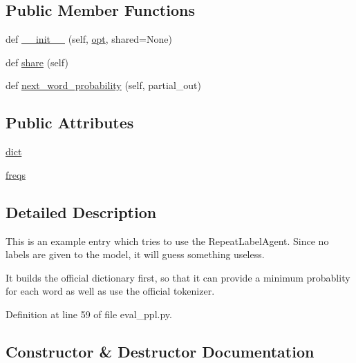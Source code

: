 \subsection*{Public Member Functions}
\begin{DoxyCompactItemize}
\item 
def \hyperlink{classprojects_1_1convai2_1_1eval__ppl_1_1WordFrequencyEntry_a3dfd58c2bf262228339cf3728b6b0caa}{\+\_\+\+\_\+init\+\_\+\+\_\+} (self, \hyperlink{classparlai_1_1core_1_1agents_1_1Agent_ab3b45d2754244608c75d4068b90cd051}{opt}, shared=None)
\item 
def \hyperlink{classprojects_1_1convai2_1_1eval__ppl_1_1WordFrequencyEntry_a5abf8443347e45742e911d441a8b9c10}{share} (self)
\item 
def \hyperlink{classprojects_1_1convai2_1_1eval__ppl_1_1WordFrequencyEntry_abc7d4ea01f82e42e8a18794e620de005}{next\+\_\+word\+\_\+probability} (self, partial\+\_\+out)
\end{DoxyCompactItemize}
\subsection*{Public Attributes}
\begin{DoxyCompactItemize}
\item 
\hyperlink{classprojects_1_1convai2_1_1eval__ppl_1_1WordFrequencyEntry_af518e0d344e66f8ec7eede1bb6359e7e}{dict}
\item 
\hyperlink{classprojects_1_1convai2_1_1eval__ppl_1_1WordFrequencyEntry_a63fd68257eda4fc1560e4b58f858312c}{freqs}
\end{DoxyCompactItemize}


\subsection{Detailed Description}
\begin{DoxyVerb}This is an example entry which tries to use the RepeatLabelAgent. Since no labels
are given to the model, it will guess something useless.

It builds the official dictionary first, so that it can provide a minimum probablity
for each word as well as use the official tokenizer.
\end{DoxyVerb}
 

Definition at line 59 of file eval\+\_\+ppl.\+py.



\subsection{Constructor \& Destructor Documentation}
\mbox{\label{classprojects_1_1convai2_1_1eval__ppl_1_1WordFrequencyEntry_a3dfd58c2bf262228339cf3728b6b0caa}} 
